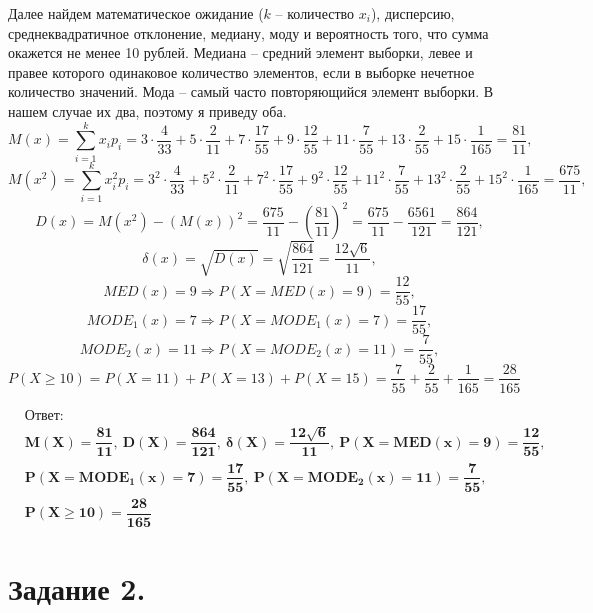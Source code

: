 \documentclass[a4paper, 12pt]{article}
\begin{document}
    \newpage
    Далее найдем математическое ожидание ($k$ -- количество $x_i$), дисперсию, среднеквадратичное отклонение, медиану, моду и вероятность того,
    что сумма окажется не менее 10 рублей. Медиана -- средний элемент выборки, левее и правее которого одинаковое количество элементов,
    если в выборке нечетное количество значений. Мода -- самый часто повторяющийся элемент выборки. В нашем случае их два, поэтому я приведу оба.
    $$
    M(x)=\sum\limits_{i=1}^kx_ip_i=3\cdot\dfrac{4}{33}+5\cdot\dfrac{2}{11}+7\cdot\dfrac{17}{55}+9\cdot\dfrac{12}{55}+11\cdot\dfrac{7}{55}+13\cdot\dfrac{2}{55}+15\cdot\dfrac{1}{165}=\dfrac{81}{11},
    $$
    $$
    M(x^2)=\sum\limits_{i=1}^kx_i^2p_i=3^2\cdot\dfrac{4}{33}+5^2\cdot\dfrac{2}{11}+7^2\cdot\dfrac{17}{55}+9^2\cdot\dfrac{12}{55}+11^2\cdot\dfrac{7}{55}+13^2\cdot\dfrac{2}{55}+15^2\cdot\dfrac{1}{165}=\dfrac{675}{11},
    $$
    $$
    D(x)=M(x^2)-(M(x))^2=\dfrac{675}{11}-\left(\dfrac{81}{11}\right)^2=\dfrac{675}{11}-\dfrac{6561}{121}=\dfrac{864}{121},
    $$
    $$
    \delta(x)=\sqrt{D(x)}=\sqrt{\dfrac{864}{121}}=\dfrac{12\sqrt{6}}{11},
    $$
    $$
    MED(x)=9\Rightarrow P(X=MED(x)=9)=\dfrac{12}{55},
    $$
    $$
    MODE_1(x)=7\Rightarrow P(X=MODE_1(x)=7)=\dfrac{17}{55},
    $$
    $$
    MODE_2(x)=11\Rightarrow P(X=MODE_2(x)=11)=\dfrac{7}{55},
    $$
    $$
    P(X\geq 10)=P(X=11)+P(X=13)+P(X=15)=\dfrac{7}{55}+\dfrac{2}{55}+\dfrac{1}{165}=\dfrac{28}{165}
    $$


    \begin{align*}
        & \textbf{Ответ:}\\
        & \mathbf{M(X)=\dfrac{81}{11},\ D(X)=\dfrac{864}{121},\ \delta(X)=\dfrac{12\sqrt{6}}{11}}, \ \mathbf{P(X=MED(x)=9)=\dfrac{12}{55}}, \\
        & \mathbf{P(X=MODE_1(x)=7)=\dfrac{17}{55},\ P(X=MODE_2(x)=11)=\dfrac{7}{55},}\\ & \mathbf{P(X\geq 10)=\dfrac{28}{165}}
    \end{align*}


    \section{Задание 2.}
\end{document}
